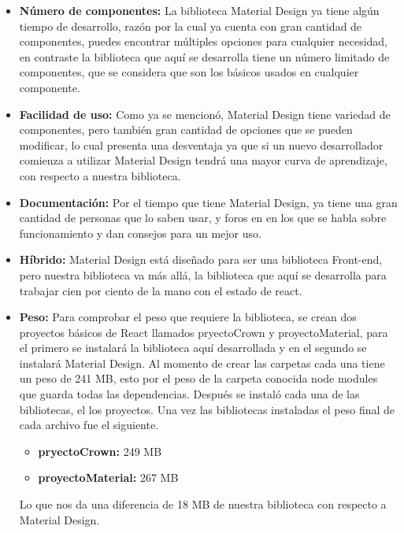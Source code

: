   \begin{itemize}
   \item \textbf{ Número de componentes:} La biblioteca Material Design ya tiene algún tiempo de desarrollo, razón por la cual ya cuenta con gran cantidad de componentes, puedes encontrar múltiples opciones para cualquier necesidad, en contraste la biblioteca que aquí se desarrolla tiene un número limitado de componentes, que se considera que son los básicos usados en cualquier componente.
   \item \textbf{ Facilidad de uso:} Como ya se mencionó, Material Design tiene variedad de componentes, pero también gran cantidad de opciones que se pueden modificar, lo cual presenta una desventaja ya que si un nuevo desarrollador comienza a utilizar Material Design tendrá una mayor curva de aprendizaje, con respecto a nuestra biblioteca.
   \item \textbf{ Documentación:} Por el tiempo que tiene Material Design, ya tiene una gran cantidad de personas que lo saben usar, y foros en en los que se habla sobre funcionamiento y dan consejos para un mejor uso.
   \item \textbf{ Híbrido:} Material Design está diseñado para ser una biblioteca Front-end, pero nuestra biblioteca va más allá, la biblioteca que aquí se desarrolla para trabajar cien por ciento de la mano con el estado de react. 
   \item \textbf{ Peso:} Para comprobar el peso que requiere la biblioteca, se crean dos proyectos básicos de React \cite{CRA}  llamados pryectoCrown y proyectoMaterial, para el primero se instalará la biblioteca aquí desarrollada y en el segundo se instalará Material Design.
Al momento de crear las carpetas cada una tiene un peso de 241 MB, esto por el peso de la carpeta conocida node modules que guarda todas las dependencias.
Después se instaló cada una de las bibliotecas, el los proyectos. Una vez las bibliotecas instaladas el peso final de cada archivo fue el siguiente.

 \begin{itemize}
  \item \textbf{pryectoCrown:}  249 MB
   \item \textbf{proyectoMaterial:}   267 MB
 \end{itemize}
 Lo que nos da una diferencia de 18 MB de nuestra biblioteca con respecto a Material Design.
  \end{itemize}



